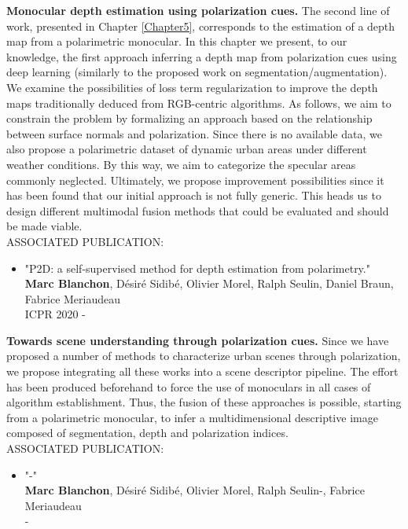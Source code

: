 \vspace*{8mm}
\textbf{Monocular depth estimation using polarization cues. }The second line of work, presented in Chapter \ref{Chapter5}, corresponds to the estimation of a depth map from a polarimetric monocular. In this chapter we present, to our knowledge, the first approach inferring a depth map from polarization cues using deep learning (similarly to the proposed work on segmentation/augmentation).
We examine the possibilities of loss term regularization to improve the depth maps traditionally deduced from RGB-centric algorithms. As follows, we aim to constrain the problem by formalizing an approach based on the relationship between surface normals and polarization. Since there is no available data, we also propose a polarimetric dataset of dynamic urban areas under different weather conditions. By this way, we aim to categorize the specular areas commonly neglected. 
Ultimately, we propose improvement possibilities since it has been found that our initial approach is not fully generic. This heads us to design different multimodal fusion methods that could be evaluated and should be made viable. \\

\vspace*{8mm}
\hspace*{10mm} ASSOCIATED PUBLICATION:
\begin{itemize}
	\item "P2D: a self-supervised method for depth estimation from polarimetry."\\
	\textbf{Marc Blanchon}, D{\'e}sir{\'e} Sidib{\'e}, Olivier Morel, Ralph Seulin, Daniel Braun, Fabrice Meriaudeau\\
	ICPR 2020 - \cite{blanchon2021p2d}
\end{itemize}
\pagebreak
\vspace*{8mm}
\textbf{Towards scene understanding through polarization cues. }Since we have proposed a number of methods to characterize urban scenes through polarization, we propose integrating all these works into a scene descriptor pipeline. The effort has been produced beforehand to force the use of monoculars in all cases of algorithm establishment. Thus, the fusion of these approaches is possible, starting from a polarimetric monocular, to infer a multidimensional descriptive image composed of segmentation, depth and polarization indices.\\

\vspace*{8mm}
\hspace*{10mm} ASSOCIATED PUBLICATION:
\begin{itemize}
	\item "-"\\
	\textbf{Marc Blanchon}, D{\'e}sir{\'e} Sidib{\'e}, Olivier Morel, Ralph Seulin-, Fabrice Meriaudeau\\
	-
\end{itemize}
